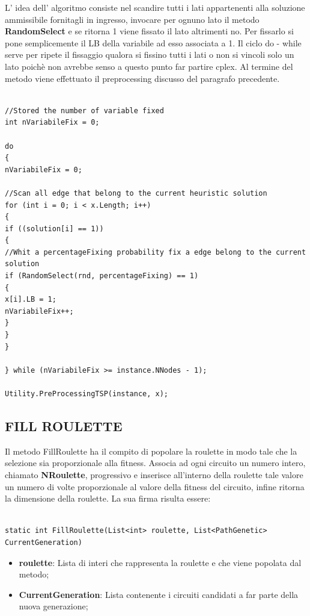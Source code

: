 \documentclass[11pt]{article}
\begin{document}
L' idea dell' algoritmo consiste nel scandire tutti i lati appartenenti alla soluzione ammissibile fornitagli in ingresso, invocare per ognuno lato il metodo \textbf{RandomSelect} e se ritorna 1 viene fissato il lato altrimenti no. Per fissarlo si pone semplicemente il LB della variabile ad esso associata a 1.  Il ciclo do - while serve per ripete il fissaggio qualora si fissino tutti i lati o non si vincoli solo un lato poichè non avrebbe senso a questo punto far partire cplex. Al termine del metodo viene effettuato il preprocessing discusso del paragrafo precedente.

\begin{lstlisting}

//Stored the number of variable fixed
int nVariabileFix = 0;

do
{
nVariabileFix = 0;

//Scan all edge that belong to the current heuristic solution
for (int i = 0; i < x.Length; i++)
{
if ((solution[i] == 1))
{
//Whit a percentageFixing probability fix a edge belong to the current solution
if (RandomSelect(rnd, percentageFixing) == 1)
{
x[i].LB = 1;
nVariabileFix++;
}
}
}

} while (nVariabileFix >= instance.NNodes - 1);

Utility.PreProcessingTSP(instance, x);

\end{lstlisting}

\subsection*{FILL ROULETTE}

Il metodo FillRoulette ha il compito di popolare la roulette in modo tale che la selezione sia proporzionale alla fitness. Associa ad ogni circuito un numero intero, chiamato \textbf{NRoulette}, progressivo e inserisce all'interno della roulette tale valore un numero di volte proporzionale al valore della fitness del circuito, infine ritorna la dimensione della roulette. La sua firma risulta essere:

\begin{lstlisting}

static int FillRoulette(List<int> roulette, List<PathGenetic> CurrentGeneration)

\end{lstlisting}

\begin{itemize}
    \item \textbf{roulette}: Lista di interi che rappresenta la roulette e che viene popolata dal metodo;
    \item \textbf{CurrentGeneration}: Lista contenente i circuiti candidati a far parte della nuova generazione;
\end{itemize}
\end{document}
